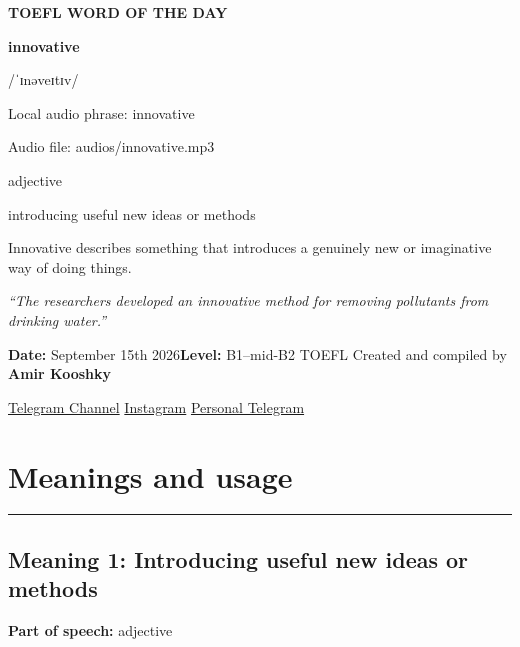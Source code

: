 \documentclass[11pt]{article}
\newcommand{\sectionrule}{\par\vspace{-0.5em}\noindent\textcolor{Accent}{\rule{\linewidth}{0.6pt}}\par}
\begin{document}
\begin{center}
{\sffamily\bfseries\color{Accent} TOEFL WORD OF THE DAY\par}
\vspace{8mm}
{\fontsize{42}{48}\selectfont\bfseries innovative\par}
\vspace{2mm}
{\Large\sffamily\color{Accent} /ˈɪnəveɪtɪv/\par}
\vspace{2mm}
{\small\sffamily Local audio phrase: innovative\par}
{\small\sffamily Audio file: audios/innovative.mp3\par}
\vspace{2mm}
{\large\sffamily\color{Muted} adjective\par}
\vspace{5mm}
{\sffamily introducing useful new ideas or methods\par}
\vspace{6mm}
{\large Innovative describes something that introduces a genuinely new or imaginative way of doing things.\par}
\vspace{6mm}
\begin{minipage}{0.84\textwidth}
\itshape “The researchers developed an innovative method for removing pollutants from drinking water.”
\end{minipage}\par
\vspace{10mm}
\textbf{Date:} September 15th 2026\quad\textbullet\quad \textbf{Level:} B1--mid-B2 TOEFL
\vfill
Created and compiled by \textbf{Amir Kooshky}\par
\vspace{2mm}
\href{https://t.me/KooshkyTOEFL}{Telegram Channel}\quad\textbullet\quad
\href{https://www.instagram.com/kooshkytoefl}{Instagram}\quad\textbullet\quad
\href{https://t.me/KooshkyTOEFL\_pv}{Personal Telegram}
\end{center}
\newpage
\tableofcontents
\newpage

\section{Meanings and usage}
\sectionrule
\subsection{Meaning 1: Introducing useful new ideas or methods}
\textbf{Part of speech:} adjective
\end{document}
